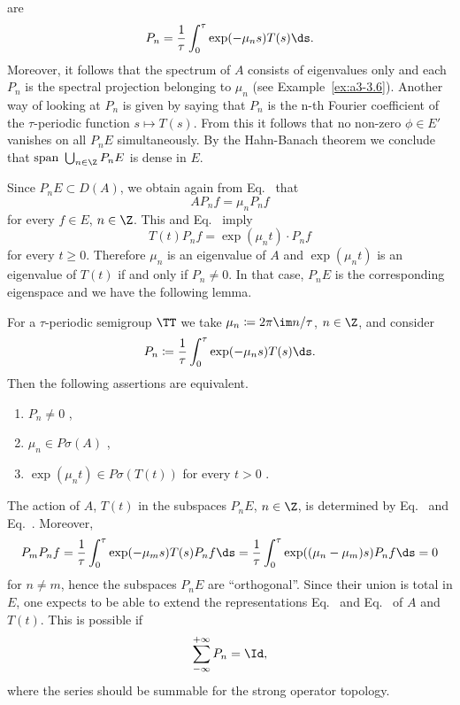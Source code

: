 are
\begin{equation}\label{eq:a3-5.2}
P_{n} = \frac{1}{\tau}\int_{0}^{\tau}\exp(-\mu_{n}s)T(s)  \ds .
\end{equation}
Moreover, it follows that the spectrum of\/ $A$ consists of eigenvalues only and each $P_{n}$ is the spectral projection belonging to $\mu_{n}$ (see Example~\ref{ex:a3-3.6}). 
Another way of looking at $P_{n}$ is given by saying that $P_{n}$ is the n-th Fourier coefficient of the $\tau$-periodic function $s \mapsto T(s)$.
From this it follows that no non-zero $\phi \in E'$ vanishes on all $P_{n}E$ simultaneously.
By the Hahn-Banach theorem we conclude that $\text{span } \bigcup_{n \in \Z} P_{n}E$ is dense in $E$.

Since $P_{n}E \subset D(A)$, we obtain again from Eq.~ that
\begin{equation}\label{eq:a3-5.3}
AP_{n}f = \mu_{n}P_{n}f
\end{equation}
for every $f \in E$, $n \in \Z$.
This and Eq.~ imply
\begin{equation}\label{eq:a3-5.4}
T(t)P_{n}f = \exp(\mu_{n}t) \cdot P_{n}f
\end{equation}
for every $t \geq 0$.
Therefore $\mu_{n}$ is an eigenvalue of\/ $A$ and $\exp(\mu_{n}t)$ is an eigenvalue of\/ $T(t)$ if and only if\/ $P_{n} \neq 0$.
In that case, $P_{n}E$ is the corresponding eigenspace and we have the following lemma.
\begin{lemma}\label{lem:a3-5.3}
For a $\tau$-periodic semigroup $\TT$ we take $\mu_{n} \coloneqq 2\pi\im n/\tau$, $n \in \Z$, and consider
\[
P_{n} \coloneqq \frac{1}{\tau}\int_{0}^{\tau} \exp(-\mu_{n}s)T(s)  \ds .
\]
Then the following assertions are equivalent.
\begin{enumerate}[\upshape (a)]
\item 
$P_{n} \neq 0$ ,

\item 
$\mu_{n} \in P\sigma(A)$ ,

\item 
$\exp(\mu_{n}t) \in P\sigma(T(t))$ for every $t > 0$ .

\end{enumerate}
\end{lemma}
The action of\/ $A$, \resp $T(t)$ in the subspaces $P_{n}E$, $n \in \Z$, is determined by Eq.~ and Eq.~.
Moreover,
\[
	P_{m}P_{n}f =  \frac{1}{\tau}\int_{0}^{\tau} \exp(-\mu_{m}s)T(s)P_{n}f  \ds 
	=  \frac{1}{\tau}\int_{0}^{\tau} \exp((\mu_{n}-\mu_{m})s)P_{n}f  \ds = 0
\]
for $n \neq m$, hence the subspaces $P_{n}E$ are \enquote{orthogonal}.
Since their union is total in $E$, one expects to be able to extend the representations Eq.~ and Eq.~ of\/ $A$ and $T(t)$.
This is possible if
\[
	\sum_{-\infty}^{+\infty} P_{n} = \Id ,
\]
where the series should be summable for the strong operator topology.

